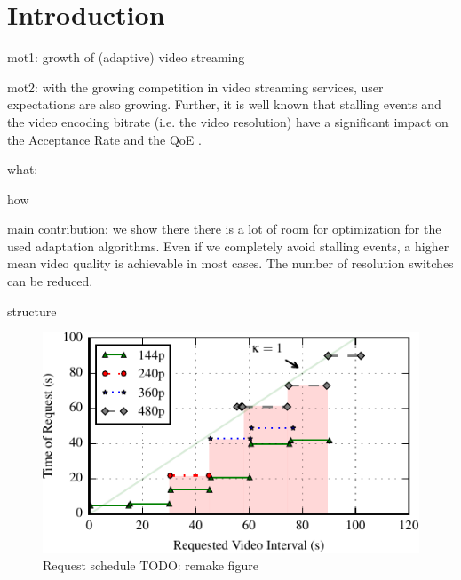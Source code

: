 
\section{Introduction}
\label{sec:introduction}

mot1: growth of (adaptive) video streaming

mot2: with the growing competition in video streaming services, user expectations are also growing. Further, it is well known that stalling events and the video encoding bitrate (i.e. the video resolution) have a significant impact on the Acceptance Rate and the QoE \cite{casas2012youtube}.

what:

how

main contribution: we show there there is a lot of room for optimization for the used adaptation algorithms. Even if we completely avoid stalling events, a higher mean video quality is achievable in most cases. The number of resolution switches can be reduced.

structure


\begin{figure}[t]
\centering
\includegraphics[width=0.9\linewidth]{figs/eg_request_schedule}%
\caption{Request schedule TODO: remake figure}
\label{fig:request_schedule}%
\end{figure}

\cite{sieber16sacrificing,sieber15costaggressive}